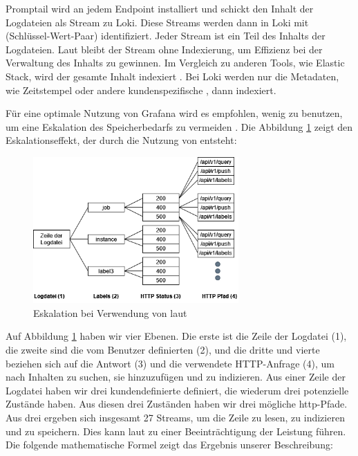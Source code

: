 Promptail wird an jedem \gls{Endpoint} installiert und schickt den Inhalt der Logdateien als Stream zu Loki. Diese Streams werden dann in Loki mit  (Schlüssel-Wert-Paar) identifiziert. Jeder Stream ist ein Teil des Inhalts der Logdateien. Laut \cite{Grafana_fundamentals} bleibt der Stream ohne Indexierung, um Effizienz bei der Verwaltung des Inhalts zu gewinnen. Im Vergleich zu anderen Tools, wie Elastic Stack, wird der gesamte Inhalt indexiert \citep{Anand_LokixELK}. Bei Loki werden nur die Metadaten, wie Zeitstempel oder andere kundenspezifische , dann indexiert.

\newpage
Für eine optimale Nutzung von Grafana wird es empfohlen, wenig  zu benutzen, um eine Eskalation des Speicherbedarfs zu vermeiden \cite{Grafana_labels}. Die Abbildung \ref{fig:Eskalation_Labels} zeigt den Eskalationseffekt, der durch die Nutzung von  entsteht:

\begin{figure}[H]
   \centering
   \includegraphics[width=0.7\textwidth]{assets/labelstream.png}
   \caption[Eskalation bei Verwendung von ]
   {Eskalation bei Verwendung von  laut \cite{Grafana_labels}}
   \label{fig:Eskalation_Labels}
   \centering
 \end{figure}
 
Auf Abbildung \ref{fig:Eskalation_Labels} haben wir vier Ebenen. Die erste ist die Zeile der Logdatei (1), die zweite sind die vom Benutzer definierten  (2), und die dritte und vierte beziehen sich auf die Antwort (3) und die verwendete HTTP-Anfrage (4), um nach Inhalten zu suchen, sie hinzuzufügen und zu indizieren. Aus einer Zeile der Logdatei haben wir drei kundendefinierte  definiert, die wiederum drei potenzielle Zustände haben. Aus diesen drei Zuständen haben wir drei mögliche \gls{http}-Pfade. Aus drei  ergeben sich insgesamt 27 Streams, um die Zeile zu lesen, zu indizieren und zu speichern. Dies kann laut \cite{Grafana_labels} zu einer Beeinträchtigung der Leistung führen. Die folgende mathematische Formel zeigt das Ergebnis unserer Beschreibung:

